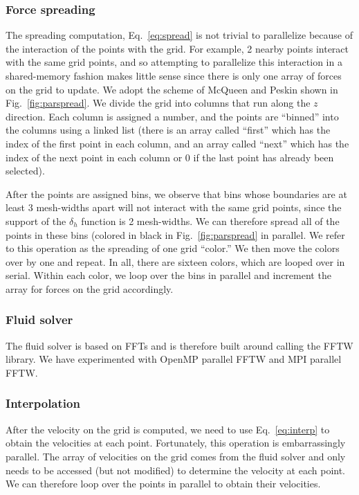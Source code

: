 \documentclass[]{article}
\begin{document}
\subsubsection{Force spreading}
The spreading computation, Eq.\ \eqref{eq:spread} is not trivial to parallelize because of the interaction of the points with the grid. For example, 2 nearby points interact with the same grid points, and so attempting to parallelize this interaction in a shared-memory fashion makes little sense since there is only one array of forces on the grid to update. We adopt the scheme of McQueen and Peskin \cite{mcqueen} shown in Fig.\ \ref{fig:parspread}. We divide the grid into columns that run along the $z$ direction. Each column is assigned a number, and the points are ``binned'' into the columns using a linked list (there is an array called ``first'' which has the index of the first point in each column, and an array called ``next'' which has the index of the next point in each column or 0 if the last point has already been selected). 

After the points are assigned bins, we observe that bins whose boundaries are at least 3 mesh-widths apart will not interact with the same grid points, since the support of the $\delta_h$ function is 2 mesh-widths. We can therefore spread all of the points in these bins (colored in black in Fig.\ \ref{fig:parspread} in parallel. We refer to this operation as the spreading of one grid ``color.'' We then move the colors over by one and repeat. In all, there are sixteen colors, which are looped over in serial. Within each color, we loop over the bins in parallel and increment the array for forces on the grid accordingly. 

\subsubsection{Fluid solver}
The fluid solver is based on FFTs and is therefore built around calling the FFTW library. We have experimented with OpenMP parallel FFTW and MPI parallel FFTW.

\subsubsection{Interpolation}
After the velocity on the grid is computed, we need to use Eq.\ \eqref{eq:interp} to obtain the velocities at each point. Fortunately, this operation is embarrassingly parallel. The array of velocities on the grid comes from the fluid solver and only needs to be accessed (but not modified) to determine the velocity at each point. We can therefore loop over the points in parallel to obtain their velocities. 
\end{document}

